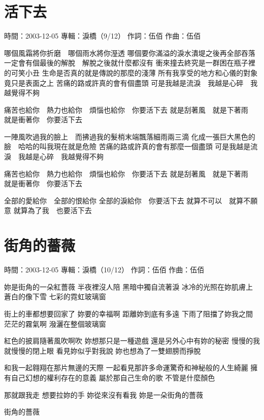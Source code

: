 \documentclass[UTF8,a4paper,oneside,twocolumn,12pt]{ctexbook}
\newcommand{\infopair}[2]{\textbullet #1：#2}
\newcommand{\zc}[1][伍佰]{\infopair{作詞}{#1}}
\newcommand{\zq}[1][伍佰]{\infopair{作曲}{#1}}
\newcommand{\zj}[1]{\infopair{專輯}{#1}}
\newcommand{\sj}[1]{\infopair{時間}{#1}}
\newenvironment{info}{\begin{flushleft}\kaishu
	}
	{\end{flushleft}\normalsize\yahei\par}
\newenvironment{lyric}{
	}
{}
\begin{document}
\section{活下去}
\begin{info}
	\sj{2003-12-05}
	\zj{淚橋（9/12）}
	\zc
	\zq
\end{info}
\begin{lyric}
	哪個風霜將你折磨　哪個雨水將你溼透
	哪個要你滿溢的淚水潰堤之後再全部吞落
	一定會有個最後的解脫　解脫之後就什麼都沒有
	衝來撞去終究是一群困在瓶子裡的可笑小丑
	生命是否真的就是傳說的那麼的淺薄
	所有我享受的地方和心儀的對象　竟只是表面之上
	苦痛的路或許真的會有個盡頭
	可是我越是流淚　我越是心碎　我越覺得不夠

	痛苦也給你　熱力也給你　煩惱也給你　你要活下去
	就是刮著風　就是下著雨　就是衝著你　你要活下去

	一陣風吹過我的臉上　而拂過我的髮梢末端飄落細雨兩三滴
	化成一張巨大黑色的臉　哈哈的叫我現在就是危險
	苦痛的路或許真的會有那麼一個盡頭
	可是我越是流淚　我越是心碎　我越覺得不夠

	痛苦也給你　熱力也給你　煩惱也給你　你要活下去
	就是刮著風　就是下著雨　就是衝著你　你要活下去

	全部的愛給你　全部的恨給你
	全部的淚給你　你要活下去
	就算不可以　就算不願意
	就算為了我　也要活下去
\end{lyric}

\section{街角的薔薇}
\begin{info}
	\sj{2003-12-05}
	\zj{淚橋（10/12）}
	\zc
	\zq
\end{info}
\begin{lyric}
	妳是街角的一朵紅薔薇 半夜裡沒人陪 黑暗中獨自流著淚
	冰冷的光照在妳肌膚上 蒼白的像下雪 七彩的霓虹玻璃窗

	街上的車都想要回家了 妳要的幸福啊 距離妳到底有多遠
	下雨了阻擋了妳我之間 茫茫的霧氣啊 潑灑在整個玻璃窗

	紅色的披肩隨著風吹啊吹 妳想那只是一種遊戲 還是另外心中有妳的秘密
	慢慢的我就慢慢的閉上眼 看見妳似乎對我說 妳也想為了一雙翅膀而掙脫

	和我一起翱翔在那片無邊的天際 一起看見那許多命運驚奇和神秘般的人生綺麗
	擁有自己幻想的權利存在的意義 屬於那自己生命的歌 不管是什麼顏色

	那就跟我走 想要拉妳的手
	妳從來沒有看我
	妳是一朵街角的薔薇

	街角的薔薇
\end{lyric}
\end{document}
